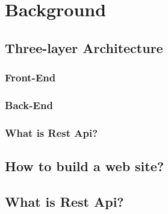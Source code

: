 
\chapter{Background} %

\label{Chapter2} %


\section{Three-layer Architecture}

\subsection{Front-End}

\subsection{Back-End}

\subsection{What is Rest Api?}


\section{How to build a web site?}

\section{What is Rest Api?}

